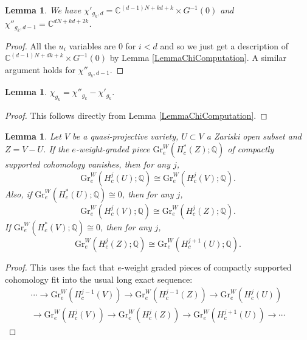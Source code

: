 \documentclass[11pt]{amsart}
\newtheorem{lemma}[thm]{Lemma}
\newcommand{\bQ}{\mathbb{Q}}
\newcommand{\bC}{\mathbb{C}}
\numberwithin{equation}{section}
\newcommand{\C}{\mathbb C}
\newcommand{\Gr}{\mathrm{Gr}}
\begin{document}
\begin{lemma} \label{lemmaAlluVanishComputation}
	We have $\chi'_{g_k,d} = \bC^{(d-1)N + kd + k} \times G^{-1}(0)$
	and $\chi''_{g_k,d-1}=\C^{dN+kd+2k}$.
\end{lemma}
\begin{proof}
	All the $u_i$ variables are $0$ for $i < d$ and so we just get a description of $\bC^{(d-1)N+dk + k} \times G^{-1}(0)$ by Lemma \ref{LemmaChiComputation}.
	A similar argument holds for $\chi''_{g_k,d-1}$.
\end{proof}





\begin{lemma} \label{lemmaChiFromChiPrime}
	$\chi_{g_k}= \chi''_{g_k}-\chi'_{g_k}.$
\end{lemma}
\begin{proof}
	This follows directly from Lemma \ref{LemmaChiComputation}.
\end{proof}

\begin{lemma} \label{lemmaHodgeLES}
	Let $V$ be a quasi-projective variety, $U \subset V$ a Zariski open subset and $Z=V-U$. If the $e$-weight-graded piece $\Gr^W_e(H_c^*(Z);\bQ)$ of compactly supported cohomology vanishes, then for any $j$,
	\begin{equation}
		\Gr^W_e(H_c^j(U);\bQ) \cong \Gr^W_e(H_c^j(V);\bQ).
	\end{equation}
	Also, if $\Gr^W_e(H_c^*(U);\bQ) \cong 0$, then for any $j$,
	\begin{equation}
		\Gr^W_e(H_c^j(V);\bQ) \cong \Gr^W_e(H_c^j(Z);\bQ).
	\end{equation}
	If $\Gr^W_e(H_c^*(V);\bQ) \cong 0$, then for any $j$,
	\begin{equation}
		\Gr^W_e(H_c^j(Z);\bQ) \cong \Gr^W_e(H_c^{j+1}(U);\bQ).
	\end{equation}
\end{lemma}
\begin{proof} This uses the fact that $e$-weight graded pieces of compactly supported cohomology fit into the usual long exact sequence:
	\begin{equation}
		\begin{aligned}
			\cdots \to
			\Gr^W_e(H_c^
			{j-1}(V))
			\to \Gr^W_e(H_c^{j-1}(Z)) \to \Gr^W_e(H_c^j(U)) \\
			\to \Gr^W_e(H_c^j(V))
			\to \Gr^W_e(H_c^j(Z))
			\to \Gr^W_e(H_c^{j+1}(U)) \to \cdots
		\end{aligned}
	\end{equation}
\end{proof}
\end{document}
